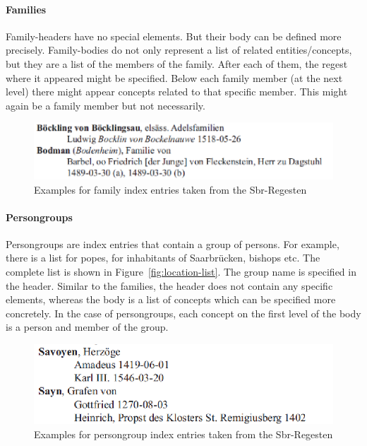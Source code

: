\paragraph{Families}
Family-headers have no special elements. But their body can be defined more precisely. Family-bodies do not only represent a list of related entities/concepts, but they are a list of the members of the family. After each of them, the regest where it appeared might be specified. Below each family member (at the next level) there might appear concepts related to that specific member. This might again be a family member but not necessarily.

\begin{figure}[h]
  \centering
  \includegraphics[scale=0.45]{img/family-example}
  \caption{Examples for family index entries taken from the Sbr-Regesten}
  \label{fig:family-example}
\end{figure}

\paragraph{Persongroups}
Persongroups are index entries that contain a group of persons. For example, there is a list for popes, for inhabitants of Saarbrücken, bishops etc. The complete list is shown in Figure~\ref{fig:location-list}. The group name is specified in the header. Similar to the families, the header does not contain any specific elements, whereas the body is a list of concepts which can be specified more concretely. In the case of persongroups, each concept on the first level of the body is a person and member of the group. %

\begin{figure}[h]
  \centering
  \includegraphics[scale=0.45]{img/persongroup-example}
  \caption{Examples for persongroup index entries taken from the Sbr-Regesten}
  \label{fig:persongroup-example}
\end{figure}

